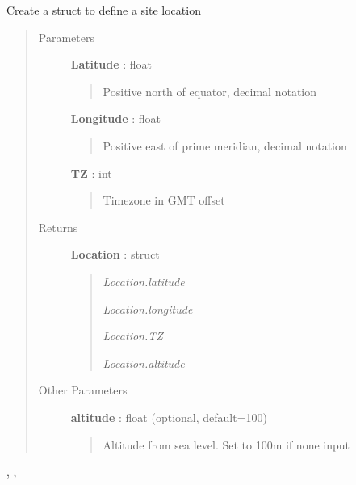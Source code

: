 \documentclass[letterpaper,10pt,english]{sphinxmanual}
\begin{document}
\begin{fulllineitems}
\label{stubs/pvlib.pvl_makelocationstruct:pvlib.pvl_makelocationstruct}
Create a struct to define a site location
\begin{quote}\begin{description}
\item[{Parameters}] \leavevmode
\textbf{Latitude} : float
\begin{quote}

Positive north of equator, decimal notation
\end{quote}

\textbf{Longitude} : float
\begin{quote}

Positive east of prime meridian, decimal notation
\end{quote}

\textbf{TZ} : int
\begin{quote}

Timezone in GMT offset
\end{quote}

\item[{Returns}] \leavevmode
\textbf{Location} : struct
\begin{quote}

\emph{Location.latitude}

\emph{Location.longitude}

\emph{Location.TZ}

\emph{Location.altitude}
\end{quote}

\item[{Other Parameters}] \leavevmode
\textbf{altitude} : float (optional, default=100)
\begin{quote}

Altitude from sea level. Set to 100m if none input
\end{quote}

\end{description}\end{quote}




{\hyperref[stubs/pvlib.pvl_ephemeris:pvlib.pvl_ephemeris]{}}, {\hyperref[stubs/pvlib.pvl_alt2pres:pvlib.pvl_alt2pres]{}}, {\hyperref[stubs/pvlib.pvl_pres2alt:pvlib.pvl_pres2alt]{}}



\end{fulllineitems}
\end{document}
